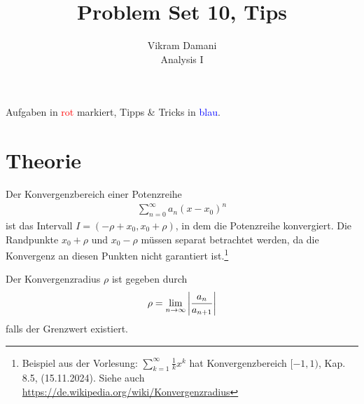 \documentclass[12pt]{article}
\newenvironment{definition}[2][Definition]{\begin{trivlist}
        \item[\hskip \labelsep {\bfseries #1}\hskip \labelsep {\bfseries #2.}]}{\flushright{$\square$}\end{trivlist}}
\begin{document}
\title{Problem Set 10, Tips}
\author{Vikram Damani\\
    Analysis I}

\maketitle
Aufgaben in \textcolor{red}{rot} markiert, Tipps \& Tricks in \textcolor{blue}{blau}.

\section{Theorie}

\begin{definition}{[(Recap) Konvergenzbereich]}
    Der Konvergenzbereich einer Potenzreihe
    \begin{align*}
        \sum_{n=0}^{\infty}a_n(x-x_0)^n
    \end{align*}
    ist das Intervall $I=(-\rho+x_0, x_0+\rho)$, in dem die Potenzreihe konvergiert. Die Randpunkte $x_0+\rho$ und $x_0-\rho$ müssen separat betrachtet werden, da die Konvergenz an diesen Punkten nicht garantiert ist.\footnote{Beispiel aus der Vorlesung: $\sum_{k=1}^{\infty}\frac{1}{k}x^k$ hat Konvergenzbereich $[-1,1)$, Kap. 8.5, (15.11.2024). Siehe auch \url{https://de.wikipedia.org/wiki/Konvergenzradius}}

    \begin{figure}[htbp!]
        \centering
    \end{figure} %

    Der Konvergenzradius $\rho$ ist gegeben durch
    \begin{align*}
        \rho=\lim_{n\to\infty}\abs{\frac{a_{n}}{a_{n+1}}}
    \end{align*}
    falls der Grenzwert existiert.
\end{definition}
\end{document}
